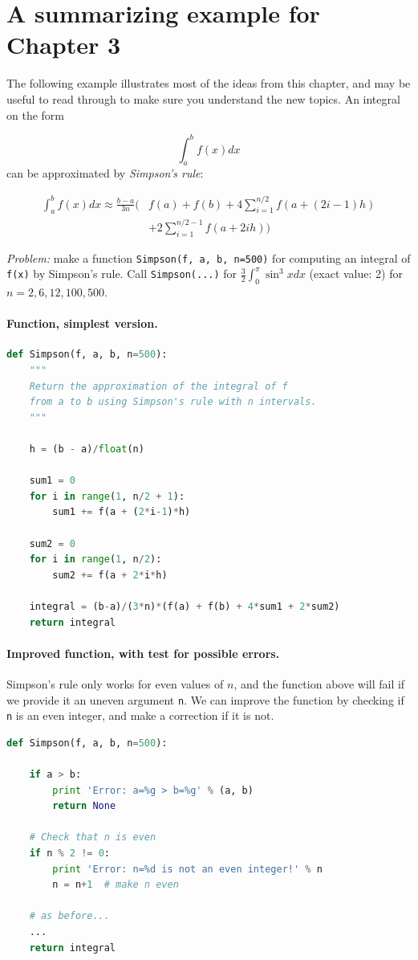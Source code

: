 \documentclass[graybox,envcountchap,sectrefs,final]{svmonodo}
\begin{document}
\section{A summarizing example for Chapter 3}
The following example illustrates most of the ideas from this chapter, and may be useful to read through to make sure you
understand the new topics.
An integral on the form

\[
\int_a^b f(x)dx
\]
can be approximated by \emph{Simpson's rule}:

\begin{align*}
\int_a^b f(x)dx \approx \frac{b-a}{3n}\biggl(
& f(a) + f(b) + 4\sum_{i=1}^{n/2} f(a + (2i-1)h)\\ 
& + 2\sum_{i=1}^{n/2-1} f(a+2ih)\biggr)
\end{align*}

\emph{Problem:} make a function \texttt{Simpson(f, a, b, n=500)} for
computing an integral of \texttt{f(x)} by Simpson's rule.
Call \texttt{Simpson(...)} for $\frac{3}{2}\int_0^\pi\sin^3x dx$ (exact
value: 2) for $n=2,6,12,100,500$.

\paragraph{Function, simplest version.}
\begin{lstlisting}[language=Python,style=blue1]
def Simpson(f, a, b, n=500):
    """
    Return the approximation of the integral of f
    from a to b using Simpson's rule with n intervals.
    """

    h = (b - a)/float(n)

    sum1 = 0
    for i in range(1, n/2 + 1):
        sum1 += f(a + (2*i-1)*h)

    sum2 = 0
    for i in range(1, n/2):
        sum2 += f(a + 2*i*h)

    integral = (b-a)/(3*n)*(f(a) + f(b) + 4*sum1 + 2*sum2)
    return integral
\end{lstlisting}

\paragraph{Improved function, with test for possible errors.}
Simpson's rule only works for even values of $n$, and the function above will fail if we provide it an uneven argument \texttt{n}.
We can improve the function by checking if \texttt{n} is an even integer, and make a correction if it is not.

\begin{lstlisting}[language=Python,style=blue1]
def Simpson(f, a, b, n=500):

    if a > b:
        print 'Error: a=%g > b=%g' % (a, b)
        return None

    # Check that n is even
    if n % 2 != 0:
        print 'Error: n=%d is not an even integer!' % n
        n = n+1  # make n even

    # as before...
    ...
    return integral
\end{lstlisting}
\end{document}
